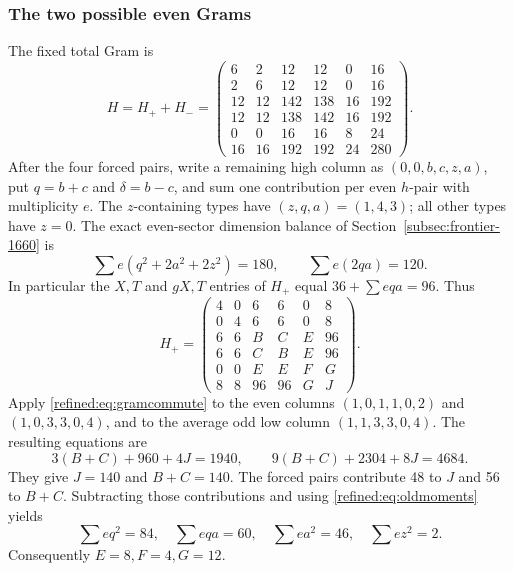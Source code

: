 \subsubsection*{The two possible even Grams}
The fixed total Gram is
\[
 H=H_++H_-=
 \begin{pmatrix}
 6&2&12&12&0&16\\2&6&12&12&0&16\\
 12&12&142&138&16&192\\12&12&138&142&16&192\\
 0&0&16&16&8&24\\16&16&192&192&24&280
 \end{pmatrix}.
\]
After the four forced pairs, write a remaining high column as $(0,0,b,c,z,a)$, put $q=b+c$ and $\delta=b-c$, and sum one contribution per even $h$-pair with multiplicity $e$. The $z$-containing types have $(z,q,a)=(1,4,3)$; all other types have $z=0$. The exact even-sector dimension balance of Section~\ref{subsec:frontier-1660} is
\begin{equation}\label{refined:eq:oldmoments}
 \sum e(q^2+2a^2+2z^2)=180,\qquad \sum e(2qa)=120.
\end{equation}
In particular the $X,T$ and $gX,T$ entries of $H_+$ equal $36+\sum eqa=96$. Thus
\[
 H_+=\begin{pmatrix}
 4&0&6&6&0&8\\0&4&6&6&0&8\\
 6&6&B&C&E&96\\6&6&C&B&E&96\\
 0&0&E&E&F&G\\8&8&96&96&G&J
 \end{pmatrix}.
\]
Apply \eqref{refined:eq:gramcommute} to the even columns $(1,0,1,1,0,2)$ and $(1,0,3,3,0,4)$, and to the average odd low column $(1,1,3,3,0,4)$. The resulting equations are
\[
 3(B+C)+960+4J=1940,\qquad
 9(B+C)+2304+8J=4684.
\]
They give $J=140$ and $B+C=140$. The forced pairs contribute 48 to $J$ and 56 to $B+C$. Subtracting those contributions and using \eqref{refined:eq:oldmoments} yields
\begin{equation}\label{refined:eq:newmoments}
 \boxed{\sum eq^2=84,\quad\sum eqa=60,\quad
 \sum ea^2=46,\quad\sum ez^2=2.}
\end{equation}
Consequently $E=8,F=4,G=12$.

